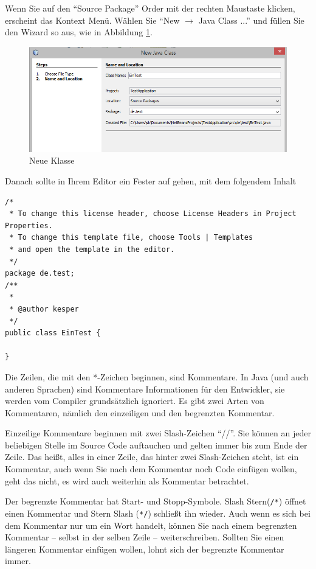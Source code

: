 \newpage
Wenn Sie auf den "`Source Package"' Order mit der rechten Maustaste klicken, erscheint das Kontext Menü. Wählen Sie "`New $\rightarrow$ Java Class ..."' und füllen Sie den Wizard so aus, wie in Abbildung \ref{nb:newclass}.

\begin{figure}[h]
\centering
\includegraphics[width=\textwidth]{img/nb003}
\caption{Neue Klasse}
\label{nb:newclass}
\end{figure}

Danach sollte in Ihrem Editor ein Fester auf gehen, mit dem folgendem Inhalt 

\begin{lstlisting}
/*
 * To change this license header, choose License Headers in Project Properties.
 * To change this template file, choose Tools | Templates
 * and open the template in the editor.
 */
package de.test;
/**
 *
 * @author kesper
 */
public class EinTest {
    
}
\end{lstlisting}
Die Zeilen, die mit den *-Zeichen beginnen, sind Kommentare. In Java (und auch anderen Sprachen) sind Kommentare Informationen für den Entwickler, sie werden vom Compiler grundsätzlich ignoriert. Es gibt zwei Arten von Kommentaren, nämlich den einzeiligen und den begrenzten Kommentar. 

Einzeilige Kommentare beginnen mit zwei Slash-Zeichen "`//"'. Sie können an jeder beliebigen Stelle im Source Code auftauchen und gelten immer bis zum Ende der Zeile. Das heißt, alles in einer Zeile, das hinter zwei Slash-Zeichen steht, ist ein Kommentar, auch wenn Sie nach dem Kommentar noch Code einfügen wollen, geht das nicht, es wird auch weiterhin als Kommentar betrachtet. 

Der begrenzte Kommentar hat Start- und Stopp-Symbole. Slash Stern(\texttt{/*}) öffnet einen Kommentar und Stern Slash (\texttt{*/}) schließt ihn wieder. Auch wenn es sich bei dem Kommentar nur um ein Wort handelt, können Sie nach einem begrenzten Kommentar -- selbst in der selben Zeile -- weiterschreiben. Sollten Sie einen längeren Kommentar einfügen wollen, lohnt sich der begrenzte Kommentar immer. 

